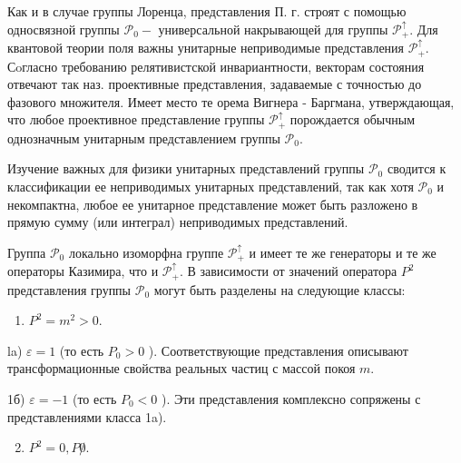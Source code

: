 \documentclass[10pt]{article}
\begin{document}
Как и в случае группы Лоренца, представления П. г. строят с помощью односвязной группы $\mathscr{P}_{0}-$ универсальной накрывающей для группы $\mathscr{P}_{+}^{\uparrow}$. Для квантовой теории поля важны унитарные неприводимые представления $\mathscr{P}_{+}^{\uparrow}$. Сoгласно требованию релятивистской инвариантности, векторам состояния отвечают так наз. проективные представления, задаваемые с точностью до фазового множителя. Имеет место те орема Вигнера - Баргмана, утверждающая, что любое проективное представление группы $\mathscr{P}_{+}^{\uparrow}$ порождается обычным однозначным унитарным представлением группы $\mathscr{P}_{0}$.



Изучение важных для физики унитарных представлений группы $\mathscr{P}_{0}$ сводится к классификации ее неприводимых унитарных представлений, так как хотя $\mathscr{P}_{0}$ и некомпактна, любое ее унитарное представление может быть разложено в прямую сумму (или интеграл) неприводимых представлений.



Группа $\mathscr{P}_{0}$ локально изоморфна группе $\mathscr{P}_{+}^{\uparrow}$ и имеет те же генераторы и те же операторы Казимира, что и $\mathscr{P}_{+}^{\uparrow}$. В зависимости от значений оператора $P^{2}$ представления группы $\mathscr{P}_{0}$ могут быть разделены на следующие классы:



\begin{enumerate}

  \item $P^{2}=m^{2}>0$.

\end{enumerate}



la) $\varepsilon=1$ (то есть $P_{0}>0$ ). Соответствующие представления описывают трансформационные свойства реальных частиц с массой покоя $m$.



1б) $\varepsilon=-1$ (то есть $P_{0}<0$ ). Эти представления комплексно сопряжены с представлениями класса 1a).



\begin{enumerate}

  \setcounter{enumi}{1}

  \item $P^{2}=0, P \not 0$.

\end{enumerate}
\end{document}
